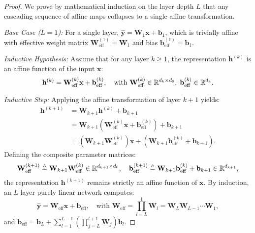 \begin{proof}
We prove by mathematical induction on the layer depth $L$ that any cascading sequence of affine maps collapses to a single affine transformation.

\textit{Base Case ($L=1$):} For a single layer, $\hat{\mathbf{y}} = \mathbf{W}_1 \mathbf{x} + \mathbf{b}_1$, which is trivially affine with effective weight matrix $\mathbf{W}_{\text{eff}}^{(1)} = \mathbf{W}_1$ and bias $\mathbf{b}_{\text{eff}}^{(1)} = \mathbf{b}_1$.

\textit{Inductive Hypothesis:} Assume that for any layer $k \ge 1$, the representation $\mathbf{h}^{(k)}$ is an affine function of the input $\mathbf{x}$:
\begin{equation}
\mathbf{h}^{(k)} = \mathbf{W}_{\text{eff}}^{(k)} \mathbf{x} + \mathbf{b}_{\text{eff}}^{(k)}, \quad \text{with } \mathbf{W}_{\text{eff}}^{(k)} \in \mathbb{R}^{d_k \times d_0}, \; \mathbf{b}_{\text{eff}}^{(k)} \in \mathbb{R}^{d_k}.
\end{equation}

\textit{Inductive Step:} Applying the affine transformation of layer $k+1$ yields:
\begin{align}
\mathbf{h}^{(k+1)} &= \mathbf{W}_{k+1} \mathbf{h}^{(k)} + \mathbf{b}_{k+1} \nonumber \\
&= \mathbf{W}_{k+1} \left( \mathbf{W}_{\text{eff}}^{(k)} \mathbf{x} + \mathbf{b}_{\text{eff}}^{(k)} \right) + \mathbf{b}_{k+1} \nonumber \\
&= \left( \mathbf{W}_{k+1} \mathbf{W}_{\text{eff}}^{(k)} \right) \mathbf{x} + \left( \mathbf{W}_{k+1} \mathbf{b}_{\text{eff}}^{(k)} + \mathbf{b}_{k+1} \right).
\end{align}
Defining the composite parameter matrices:
\begin{equation}
\mathbf{W}_{\text{eff}}^{(k+1)} \triangleq \mathbf{W}_{k+1} \mathbf{W}_{\text{eff}}^{(k)} \in \mathbb{R}^{d_{k+1} \times d_0}, \quad \mathbf{b}_{\text{eff}}^{(k+1)} \triangleq \mathbf{W}_{k+1} \mathbf{b}_{\text{eff}}^{(k)} + \mathbf{b}_{k+1} \in \mathbb{R}^{d_{k+1}},
\end{equation}
the representation $\mathbf{h}^{(k+1)}$ remains strictly an affine function of $\mathbf{x}$. By induction, an $L$-layer purely linear network computes:
\begin{equation}
\hat{\mathbf{y}} = \mathbf{W}_{\text{eff}} \mathbf{x} + \mathbf{b}_{\text{eff}}, \quad \text{with } \mathbf{W}_{\text{eff}} = \prod_{l=L}^1 \mathbf{W}_l = \mathbf{W}_L \mathbf{W}_{L-1} \cdots \mathbf{W}_1,
\label{eq:compositional_collapse_result}
\end{equation}
and $\mathbf{b}_{\text{eff}} = \mathbf{b}_L + \sum_{l=1}^{L-1} \left( \prod_{j=L}^{l+1} \mathbf{W}_j \right) \mathbf{b}_l$.
\end{proof}

